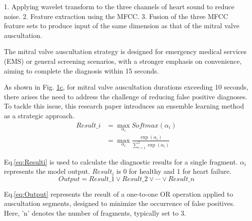 1. Applying wavelet transform to the three channels of heart sound to reduce noise.
2. Feature extraction using the MFCC.
3. Fusion of the three MFCC feature sets to produce input of the same dimension as that of the mitral valve auscultation.

The mitral valve auscultation strategy is designed for emergency medical services (EMS) or general screening scenarios, with a stronger emphasis on convenience, aiming to complete the diagnosis within 15 seconds.

As shown in Fig. \hyperref[FIG:Methodology]{1c}, for mitral valve auscultation durations exceeding 10 seconds, there arises the need to address the challenge of reducing false positive diagnoses. To tackle this issue, this research paper introduces an ensemble learning method as a strategic approach.
\begin{equation}
\begin{split}
Result\_i&= \max \limits_{\alpha_{i}}Softmax(\alpha_{i}) \\
&= \max \limits_{\alpha_{i}}\frac{\exp(\alpha_{i})}{\sum_{i=1}^{2} \exp(\alpha_{i})}
	\label{eq:Resulti}
\end{split}
\end{equation} 

Eq.\ref{eq:Resulti} is used to calculate the diagnostic results for a single fragment. $\alpha_{i}$ represents the model output. $Result_{i}$ is 0 for healthy and 1 for heart failure.
\begin{equation}
Output = Result\_1 \lor Result\_2 \lor \cdots \lor Result\_n
\label{eq:Output}
\end{equation} 

Eq.\ref{eq:Output} represents the result of a one-to-one OR operation applied to auscultation segments, designed to minimize the occurrence of false positives. Here, 'n' denotes the number of fragments, typically set to 3.